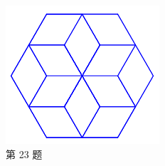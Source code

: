 \documentclass[10pt, a4paper]{article}
\begin{document}
\begin{enumerate}
\begin{figure}[htbp]
\begin{minipage}[t]{.26\textwidth}
\begin{minipage}[t]{.5\textwidth}
                \end{minipage}
                \caption*{第 23 题}
            \end{minipage}
            \begin{minipage}[t]{.26\textwidth}
                \centering
                \begin{minipage}[t]{.55\textwidth}
                    \centering
                    \includegraphics[width=\textwidth]{figure/24-1.png}
                \end{minipage}
                \begin{minipage}[t]{.4\textwidth}
                    \centering

\end{minipage}
\end{minipage}
\end{figure}
\end{enumerate}
\end{document}
